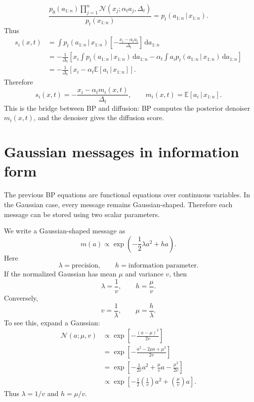 \documentclass[11pt]{article}
\newcommand{\E}{\mathbb{E}}
\newcommand{\N}{\mathcal{N}}
\newcommand{\dd}{\,\mathrm{d}}
\newcommand{\given}{\,|\,}
\begin{document}
\begin{equation}
  \frac{p_0(a_{1:n})\prod_{j=1}^n\N(x_j;\alpha_t a_j,\Delta_t)}{p_t(x_{1:n})}
  =p_t(a_{1:n}\given x_{1:n}).
\end{equation}
Thus
\begin{align}
  s_i(x,t)
  &=
  \int
  p_t(a_{1:n}\given x_{1:n})
  \left[-\frac{x_i-\alpha_t a_i}{\Delta_t}\right]
  \dd a_{1:n} \\
  &=
  -\frac{1}{\Delta_t}
  \left[
  x_i\int p_t(a_{1:n}\given x_{1:n})\dd a_{1:n}
  -\alpha_t\int a_i p_t(a_{1:n}\given x_{1:n})\dd a_{1:n}
  \right] \\
  &=
  -\frac{1}{\Delta_t}
  \left[x_i-\alpha_t\E[a_i\given x_{1:n}]\right].
\end{align}
Therefore
\begin{equation}
  \boxed{
  s_i(x,t)=-\frac{x_i-\alpha_t m_i(x,t)}{\Delta_t},
  \qquad
  m_i(x,t)=\E[a_i\given x_{1:n}].
  }
  \label{eq:score-from-denoiser}
\end{equation}
This is the bridge between BP and diffusion: BP computes the posterior denoiser \(m_i(x,t)\), and the denoiser gives the diffusion score.

\section{Gaussian messages in information form}

The previous BP equations are functional equations over continuous variables. In the Gaussian case, every message remains Gaussian-shaped. Therefore each message can be stored using two scalar parameters.

We write a Gaussian-shaped message as
\begin{equation}
  m(a)\propto \exp\left(-\frac12\lambda a^2+ha\right).
  \label{eq:info-form}
\end{equation}
Here
\[
  \lambda=\text{precision},
  \qquad
  h=\text{information parameter}.
\]
If the normalized Gaussian has mean \(\mu\) and variance \(v\), then
\begin{equation}
  \lambda=\frac{1}{v},
  \qquad
  h=\frac{\mu}{v}.
\end{equation}
Conversely,
\begin{equation}
  v=\frac{1}{\lambda},
  \qquad
  \mu=\frac{h}{\lambda}.
\end{equation}
To see this, expand a Gaussian:
\begin{align}
  \N(a;\mu,v)
  &\propto
  \exp\left[-\frac{(a-\mu)^2}{2v}\right] \\
  &=
  \exp\left[-\frac{a^2-2\mu a+\mu^2}{2v}\right] \\
  &=
  \exp\left[-\frac{1}{2v}a^2+\frac{\mu}{v}a-\frac{\mu^2}{2v}\right] \\
  &\propto
  \exp\left[-\frac12\left(\frac1v\right)a^2+\left(\frac{\mu}{v}\right)a\right].
\end{align}
Thus \(\lambda=1/v\) and \(h=\mu/v\).
\end{document}
